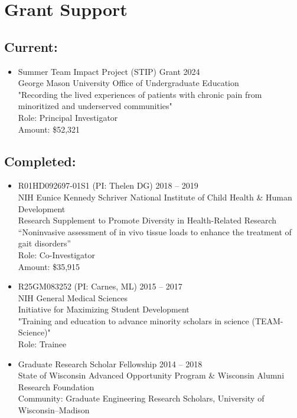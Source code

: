 \documentclass[letterpaper, 10pt]{article}
\begin{document}
\section{Grant Support}

\subsection{Current:}
\begin{itemize}
    \item[] Summer Team Impact Project (STIP) Grant \hfill 2024\\
    George Mason University Office of Undergraduate Education\\
    "Recording the lived experiences of patients with chronic pain from minoritized and underserved communities"\\
    Role: Principal Investigator\\
    Amount: \$52,321\\
    
\end{itemize}


\subsection{Completed:}
\begin{itemize}
    \item[] R01HD092697-01S1 (PI: Thelen DG) \hfill 2018 -- 2019\\ %
    NIH Eunice Kennedy Schriver National Institute of Child Health \& Human Development\\
    Research Supplement to Promote Diversity in Health-Related Research\\
    “Noninvasive assessment of in vivo tissue loads to enhance the treatment of gait disorders”\\
    Role: Co-Investigator\\
    Amount: \$35,915\\
    
    \item[] R25GM083252 (PI: Carnes, ML) \hfill 2015 -- 2017\\
    NIH General Medical Sciences\\
    Initiative for Maximizing Student Development\\
    "Training and education to advance minority scholars in science (TEAM-Science)"\\
    Role: Trainee\\
    
    \item[] Graduate Research Scholar Fellowship \hfill 2014 -- 2018\\
    State of Wisconsin Advanced Opportunity Program \& Wisconsin Alumni Research Foundation\\
    Community: Graduate Engineering Research Scholars, University of Wisconsin--Madison\\

\end{itemize}
\end{document}
